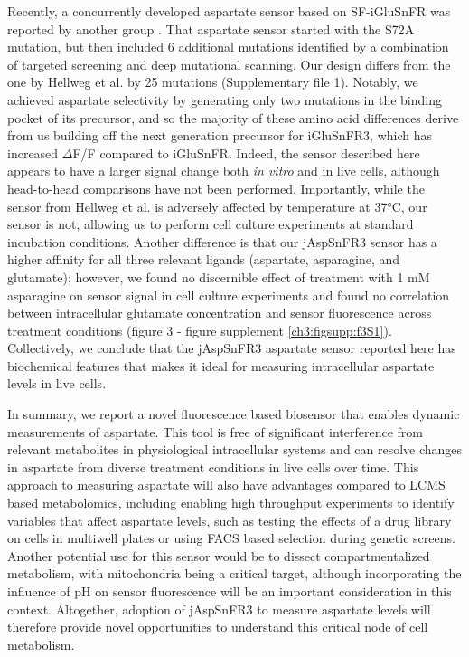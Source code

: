 Recently, a concurrently developed aspartate sensor based on SF-iGluSnFR was reported by another group \cite{Hellweg2023}.
That aspartate sensor started with the S72A mutation, but then included 6 additional mutations identified by a combination of targeted screening and deep mutational scanning.
Our design differs from the one by Hellweg et al. \cite{Hellweg2023} by 25 mutations (Supplementary file 1).
Notably, we achieved aspartate selectivity by generating only two mutations in the binding pocket of its precursor, and so the majority of these amino acid differences derive from us building off the next generation precursor for iGluSnFR3, which has increased $\Delta$F/F compared to iGluSnFR.
Indeed, the sensor described here appears to have a larger signal change both \textit{in vitro} and in live cells, although head-to-head comparisons have not been performed.
Importantly, while the sensor from Hellweg et al. \cite{Hellweg2023} is adversely affected by temperature at 37°C, our sensor is not, allowing us to perform cell culture experiments at standard incubation conditions.
Another difference is that our jAspSnFR3 sensor has a higher affinity for all three relevant ligands (aspartate, asparagine, and glutamate); however, we found no discernible effect of treatment with 1 mM asparagine on sensor signal in cell culture experiments and found no correlation between intracellular glutamate concentration and sensor fluorescence across treatment conditions (figure 3 - figure supplement \ref{ch3:figsupp:f3S1}).
Collectively, we conclude that the jAspSnFR3 aspartate sensor reported here has biochemical features that makes it ideal for measuring intracellular aspartate levels in live cells.

In summary, we report a novel fluorescence based biosensor that enables dynamic measurements of aspartate.
This tool is free of significant interference from relevant metabolites in physiological intracellular systems and can resolve changes in aspartate from diverse treatment conditions in live cells over time.
This approach to measuring aspartate will also have advantages compared to LCMS based metabolomics, including enabling high throughput experiments to identify variables that affect aspartate levels, such as testing the effects of a drug library on cells in multiwell plates or using FACS based selection during genetic screens.
Another potential use for this sensor would be to dissect compartmentalized metabolism, with mitochondria being a critical target, although incorporating the influence of pH on sensor fluorescence will be an important consideration in this context.
Altogether, adoption of jAspSnFR3 to measure aspartate levels will therefore provide novel opportunities to understand this critical node of cell metabolism.



